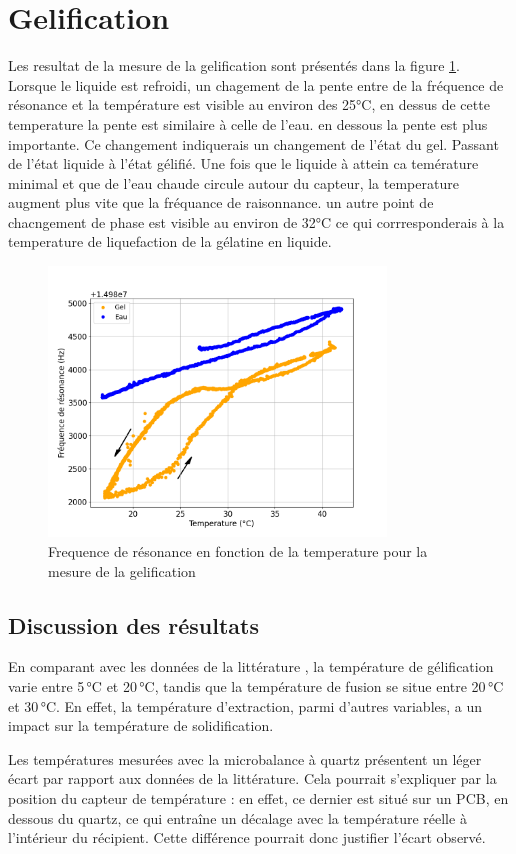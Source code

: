 \section{Gelification}
Les resultat de la mesure de la gelification sont présentés dans la figure \ref{fig:Frequence gelification}. 
Lorsque le liquide est refroidi,
un chagement de la pente entre de la fréquence de résonance et la température est visible au environ des 25°C, 
en dessus de cette temperature la pente est similaire à celle de l'eau. en dessous la pente est plus importante.  
Ce changement indiquerais un changement de l'état du gel. Passant de l'état liquide à l'état gélifié.
Une fois que le liquide à attein ca temérature minimal et que de l'eau chaude circule autour du capteur,
la temperature augment plus vite que la fréquance de raisonnance. un autre point de chacngement de phase est visible au environ de 32°C ce qui corrresponderais à la temperature de liquefaction de la gélatine en liquide.
\begin{figure}[H]
    \centering
    \includegraphics[width=0.8\textwidth]{assets/figures/gel.png}
    \caption{Frequence de résonance en fonction de la temperature pour la mesure de la gelification}
    \label{fig:Frequence gelification}
\end{figure}
\subsection{Discussion des résultats}
En comparant avec les données de la littérature \cite{SHA2019163}, la température de gélification varie entre 5 °C et 20 °C, tandis que la température de fusion se situe entre 20 °C et 30 °C. En effet, la température d’extraction, parmi d’autres variables, a un impact sur la température de solidification.

Les températures mesurées avec la microbalance à quartz présentent un léger écart par rapport aux données de la littérature. Cela pourrait s’expliquer par la position du capteur de température : en effet, ce dernier est situé sur un PCB, en dessous du quartz, ce qui entraîne un décalage avec la température réelle à l’intérieur du récipient. Cette différence pourrait donc justifier l’écart observé.


